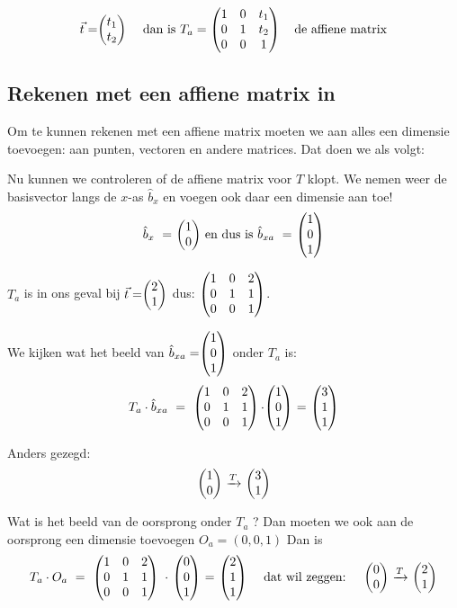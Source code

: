 \[
    \vec{t} = \vectweesnel{t} \quad \text{ dan is } T_a = \matdrie{1&0&t_1}{0&1&t_2}{0&0&1} \quad \text {de affiene matrix} 
\]


\subsection{Rekenen met een affiene  matrix in \RT}
Om te kunnen rekenen met een affiene matrix moeten we aan alles een dimensie toevoegen: aan punten, vectoren en andere matrices. Dat doen we als volgt: 
\vspace{-5mm}

Nu kunnen we controleren of de affiene matrix voor $T$ klopt. We nemen weer de basisvector langs de $x$-as $ \hat{b}_x$ en voegen ook daar een dimensie aan toe! 
\[\hat{b}_x\ =\ \vectwee{1}{0} \text{ en dus is } \hat{b}_{xa}\ =\ \vecdrie{1}{0}{1}\] 

$T_a$ is in ons geval bij $\vec{t}= \vectwee{2}{1} $ dus: $\begin{pmatrix} 1&0&2 \\ 0&1&1 \\ 0&0&1 \end{pmatrix} $. 

We kijken wat het beeld van $\hat{b}_{xa} = \vecdrie{1}{0}{1} $ onder $T_a$ is: 
\[ T_a \cdot \hat{b}_{xa}\ =\ \matdrie{1&0&2}{0&1&1}{0&0&1} \cdot \vecdrie{1}{0}{1} \ =\ \vecdrie{3}{1}{1}\]  

Anders gezegd: \[ \vectwee{1}{0} \ \xrightarrow{T} \ \vectwee{3}{1} \]

Wat is het beeld van de oorsprong onder $T_a$ ? Dan moeten we ook aan de oorsprong een dimensie toevoegen $O_a = (0,0,1)$ Dan is
\[
 T_a \cdot O_a\ =\ \matdrie{1&0&2}{0&1&1}{0&0&1} \ \cdot\ \vecdrie{0}{0}{1} \ =\ \vecdrie{2}{1}{1} \quad 
 \text{ dat wil zeggen: } \quad \vectwee{0}{0} \ \xrightarrow{T} \ \vectwee{2}{1}
\]


